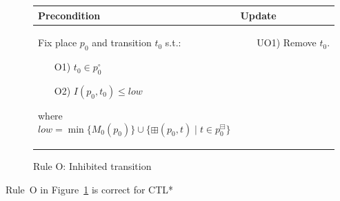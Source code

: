 \begin{figure}[h!]
    \vspace{1cm}

    \begin{adjustbox}{center}
        \begin{tabular}{|p{80mm}|p{45mm}|} \hline
        Precondition & Update \\ \hline
        Fix place $p_0$ and transition $t_0$ s.t.:
        \begin{itemize}[leftmargin=10mm]
            \item[O1)] $t_0\in p_0^\circ$
            \item[O2)] $I(p_0,t_0)\leq low$
        \end{itemize}
        where
        \[
            low=\min\{M_0(p_0)\}\cup\{\boxplus(p_0, t)\mid t\in p_0^\boxminus\}
        \]
        &
        \begin{itemize}[leftmargin=10mm]
            \item[UO1)] Remove $t_0$.
        \end{itemize} \\ \hline
        \end{tabular}
    \end{adjustbox}
    \caption{Rule O: Inhibited transition}
    \label{fig:rule_o}
\end{figure}

\begin{theorem}
    Rule~O in Figure~\ref{fig:rule_o} is correct for CTL*
\end{theorem}
